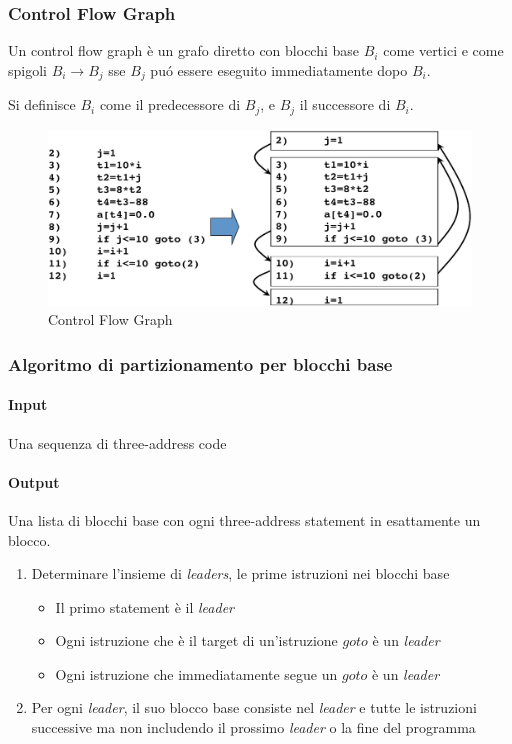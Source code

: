 \subsubsection{Control Flow Graph}
\begin{definition}
Un control flow graph \`e un grafo diretto con blocchi base $B_i$ come vertici
e come spigoli $B_i \to B_j$ sse $B_j$ pu\'o essere eseguito immediatamente
dopo $B_i$.
\end{definition}

Si definisce $B_i$ come il predecessore di $B_j$, e $B_j$ il successore di
$B_i$.

\begin{figure}[H]
  \centering
  \includegraphics[scale=0.35]{res/image/control_flow_graph}
  \caption{Control Flow Graph}
  \label{img:control_flow_graph}
\end{figure}

\subsubsection{Algoritmo di partizionamento per blocchi base}
\paragraph{Input}
Una sequenza di three-address code
\paragraph{Output}
Una lista di blocchi base con ogni three-address statement in esattamente un
blocco.

\begin{enumerate}
\item Determinare l'insieme di \textit{leaders}, le prime istruzioni nei
blocchi base
\begin{itemize}
\item Il primo statement \`e il \textit{leader}
\item Ogni istruzione che \`e il target di un'istruzione $goto$ \`e un
\textit{leader}
\item Ogni istruzione che immediatamente segue un $goto$ \`e un \textit{leader}
\end{itemize}
\item Per ogni \textit{leader}, il suo blocco base consiste nel \textit{leader}
e tutte le istruzioni successive ma non includendo il prossimo \textit{leader}
o la fine del programma
\end{enumerate}

